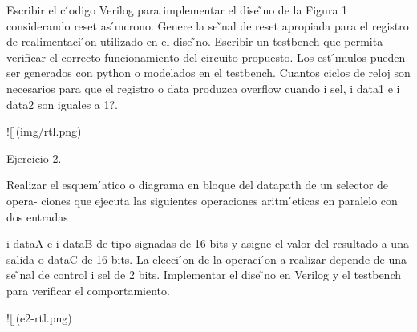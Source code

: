 Escribir el c ́odigo Verilog para implementar el dise ̃no de la Figura 1 considerando reset
as ́ıncrono.
Genere la se ̃nal de reset apropiada para el registro de realimentaci ́on utilizado en el
dise ̃no.
Escribir un testbench que permita verificar el correcto funcionamiento del circuito
propuesto. Los est ́ımulos pueden ser generados con python o modelados en el testbench.
Cuantos ciclos de reloj son necesarios para que el registro o data produzca overflow
cuando i sel, i data1 e i data2 son iguales a 1?.

![](img/rtl.png)


Ejercicio 2.

Realizar el esquem ́atico o diagrama en bloque del datapath de un selector de opera-
ciones que ejecuta las siguientes operaciones aritm ́eticas en paralelo con dos entradas

i dataA e i dataB de tipo signadas de 16 bits y asigne el valor del resultado a una
salida o dataC de 16 bits.
La elecci ́on de la operaci ́on a realizar depende de una se ̃nal de control i sel de 2 bits.
Implementar el dise ̃no en Verilog y el testbench para verificar el comportamiento.

![](e2-rtl.png)

